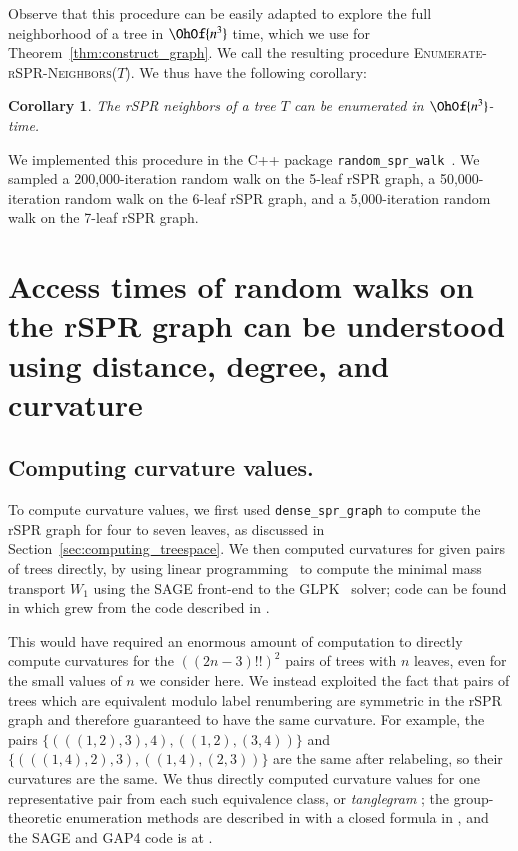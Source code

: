 \documentclass[]{elsarticle}
\newtheorem{cor}[thm]{Corollary}
\begin{document}
Observe that this procedure can be easily adapted to explore the full neighborhood of a tree in $\OhOf{n^3}$ time, which we use for Theorem~\ref{thm:construct_graph}. We call the resulting procedure \textsc{Enumerate-rSPR-Neighbors($T$)}.
We thus have the following corollary:

\begin{cor}
\label{cor:enumerate_neighbors}
	The rSPR neighbors of a tree $T$ can be enumerated in $\OhOf{n^3}$-time.
\end{cor}

We implemented this procedure in the C++ package \texttt{random\_spr\_walk}~\citep{random_spr_walk}.
We sampled a 200,000-iteration random walk on the 5-leaf rSPR graph, a 50,000-iteration random walk on the 6-leaf rSPR graph, and a 5,000-iteration random walk on the 7-leaf rSPR graph.

\section{Access times of random walks on the rSPR graph can be understood using distance, degree, and curvature}

\subsection{Computing curvature values.}
\label{sec:results:curvature}
To compute curvature values, we first used \texttt{dense\_spr\_graph} to compute the rSPR graph for four to seven leaves, as discussed in Section~\ref{sec:computing_treespace}.
We then computed curvatures for given pairs of trees directly, by using linear programming~\citep{Loisel2014-hu} to compute the minimal mass transport $W_1$ using the SAGE \citep{SAGE} front-end to the GLPK~\citep{glpk} solver; code can be found in \citep{gricci} which grew from the code described in \citep{Loisel2014-hu}.

This would have required an enormous amount of computation to directly compute curvatures for the $((2n-3)!!)^2$ pairs of trees with $n$ leaves, even for the small values of $n$ we consider here.
We instead exploited the fact that pairs of trees which are equivalent modulo label renumbering are symmetric in the rSPR graph and therefore guaranteed to have the same curvature.
For example, the pairs
$\{(((1,2),3),4), ((1,2),(3,4))\}$ and
$\{(((1,4),2),3), ((1,4),(2,3))\}$
are the same after relabeling, so their curvatures are the same.
We thus directly computed curvature values for one representative pair from each such equivalence class, or \emph{tanglegram} \citep{Venkatachalam2010-zh}; the group-theoretic enumeration methods are described in \citep{Matsen2015-yv} with a closed formula in \citep{billey2016trees}, and the SAGE \citep{SAGE} and GAP4 \citep{GAP4} code is at \citep{tangle}.
\end{document}
